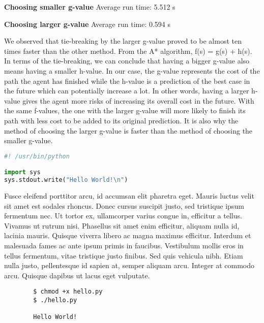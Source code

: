 \documentclass{article}
\begin{document}
\textbf{Choosing smaller g-value}
Average run time: 5.512 s

\textbf{Choosing larger g-value}
Average run time: 0.594 s


We observed that tie-breaking by the larger g-value proved to be almost ten times faster than the other method. From the A* algorithm, f(s) = g(s) + h(s). In terms of the tie-breaking, we can conclude that having a bigger g-value also means having a smaller h-value. In our case, the g-value represents the cost of the path the agent has finished while the h-value is a prediction of the best case in the future which can potentially increase a lot. In other words, having a larger h-value gives the agent more risks of increasing its overall cost in the future. With the same f-values, the one with the larger g-value will more likely to finish its path with less cost to be added to its original prediction. It is also why the method of choosing the larger g-value is faster than the method of choosing the smaller g-value.

\begin{file}[hello.py]
\begin{lstlisting}[language=Python]
#! /usr/bin/python

import sys
sys.stdout.write("Hello World!\n")
\end{lstlisting}
\end{file}

Fusce eleifend porttitor arcu, id accumsan elit pharetra eget. Mauris luctus velit sit amet est sodales rhoncus. Donec cursus suscipit justo, sed tristique ipsum fermentum nec. Ut tortor ex, ullamcorper varius congue in, efficitur a tellus. Vivamus ut rutrum nisi. Phasellus sit amet enim efficitur, aliquam nulla id, lacinia mauris. Quisque viverra libero ac magna maximus efficitur. Interdum et malesuada fames ac ante ipsum primis in faucibus. Vestibulum mollis eros in tellus fermentum, vitae tristique justo finibus. Sed quis vehicula nibh. Etiam nulla justo, pellentesque id sapien at, semper aliquam arcu. Integer at commodo arcu. Quisque dapibus ut lacus eget vulputate.

\begin{commandline}
	\begin{verbatim}
		$ chmod +x hello.py
		$ ./hello.py

		Hello World!
	\end{verbatim}
\end{commandline}
\end{document}
